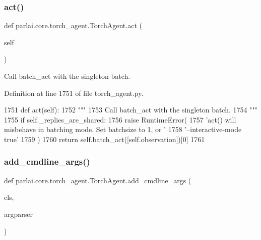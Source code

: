 \subsubsection{\texorpdfstring{act()}{act()}}
{\footnotesize\ttfamily def parlai.\+core.\+torch\+\_\+agent.\+Torch\+Agent.\+act (\begin{DoxyParamCaption}\item[{}]{self }\end{DoxyParamCaption})}

\begin{DoxyVerb}Call batch_act with the singleton batch.
\end{DoxyVerb}
 

Definition at line 1751 of file torch\+\_\+agent.\+py.


\begin{DoxyCode}
1751     \textcolor{keyword}{def }act(self):
1752         \textcolor{stringliteral}{"""}
1753 \textcolor{stringliteral}{        Call batch\_act with the singleton batch.}
1754 \textcolor{stringliteral}{        """}
1755         \textcolor{keywordflow}{if} self.\_replies\_are\_shared:
1756             \textcolor{keywordflow}{raise} RuntimeError(
1757                 \textcolor{stringliteral}{'act() will misbehave in batching mode. Set batchsize to 1, or '}
1758                 \textcolor{stringliteral}{'--interactive-mode true'}
1759             )
1760         \textcolor{keywordflow}{return} self.batch\_act([self.observation])[0]
1761 
\end{DoxyCode}
\mbox{\label{classparlai_1_1core_1_1torch__agent_1_1TorchAgent_a4a72bdd07d2cb5ce402d0058140cad0d}} 
\subsubsection{\texorpdfstring{add\+\_\+cmdline\+\_\+args()}{add\_cmdline\_args()}}
{\footnotesize\ttfamily def parlai.\+core.\+torch\+\_\+agent.\+Torch\+Agent.\+add\+\_\+cmdline\+\_\+args (\begin{DoxyParamCaption}\item[{}]{cls,  }\item[{}]{argparser }\end{DoxyParamCaption})}

